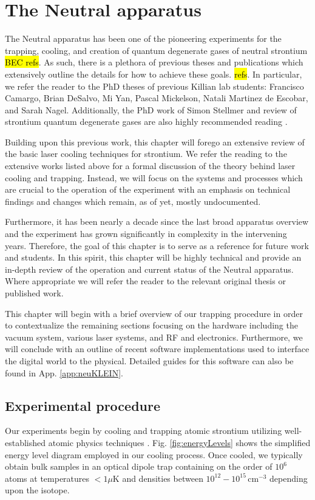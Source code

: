 \chapter{The Neutral apparatus}
\label{ch:chap2}

The Neutral apparatus has been one of the pioneering experiments for the trapping, cooling, and creation of quantum degenerate gases of neutral strontium \hl{BEC refs}. 
As such, there is a plethora of previous theses and publications which extensively outline the details for how to achieve these goals. \hl{refs}. 
In particular, we refer the reader to the PhD theses of previous Killian lab students: Francisco Camargo, Brian DeSalvo, Mi Yan, Pascal Mickelson, Natali Martinez de Escobar, and Sarah Nagel. 
Additionally, the PhD work of Simon Stellmer \cite{SimonStellmer2013} and review of strontium quantum degenerate gases are also highly recommended reading \cite{StellmerRev2013}.

Building upon this previous work, this chapter will forego an extensive review of the basic laser cooling techniques for strontium. 
We refer the reading to the extensive works listed above for a formal discussion of the theory behind laser cooling and trapping.
Instead, we will focus on the systems and processes which are crucial to the operation of the experiment with an emphasis on technical findings and changes which remain, as of yet, mostly undocumented.

Furthermore, it has been nearly a decade since the last broad apparatus overview \cite{MartinezdeEscolar2010} and the experiment has grown significantly in complexity in the intervening years.
Therefore, the goal of this chapter is to serve as a reference for future work and students. 
In this spirit, this chapter will be highly technical and provide an in-depth review of the operation and current status of the Neutral apparatus.
Where appropriate we will refer the reader to the relevant original thesis or published work.

This chapter will begin with a brief overview of our trapping procedure in order to contextualize the remaining sections focusing on the hardware including the vacuum system, various laser systems, and RF and electronics.
Furthermore, we will conclude with an outline of recent software implementations used to interface the digital world to the physical.
Detailed guides for this software can also be found in App. \ref{app:neuKLEIN}.

\section{Experimental procedure} \label{sec:trapping}
\setcounter{footnote}{0}
Our experiments begin by cooling and trapping atomic strontium utilizing well-established atomic physics techniques \cite{Metcalf1999,Katori1999,Ido2000,Nagel2003,Mukaiyama2003a,Loftus2004,mmy09a,sth09a,Mickelson2010ja,Tey2010a,dym10a,stg10}. 
Fig. \;\ref{fig:energyLevels} shows the simplified energy level diagram employed in our cooling process. 
Once cooled, we typically obtain bulk samples in an optical dipole trap containing on the order of $10^6$ atoms at temperatures $<1\mu$K and densities between $10^{12} - 10^{15}\,$cm$^{-3}$ depending upon the isotope. 

